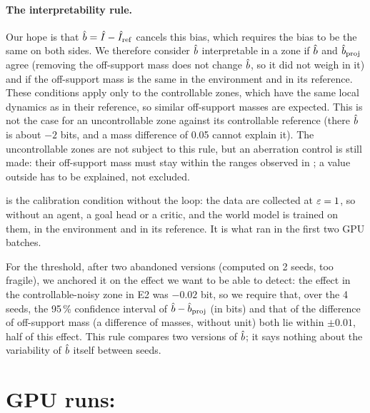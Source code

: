 \documentclass[10pt]{article}
\begin{document}
\paragraph{The interpretability rule.}
Our hope is that $\hat{b} = \hat{I} - \hat{I}_{\mathrm{ref}}$ cancels this bias, which requires the bias to be the same on both sides.
We therefore consider $\hat{b}$ interpretable in a zone if $\hat{b}$ and $\hat{b}_{\mathrm{proj}}$ agree (removing the
off-support mass does not change $\hat{b}$, so it did not weigh in it) and if the off-support mass is the same in the
environment and in its reference.
These conditions apply only to the controllable zones, which have the same local dynamics as in their reference, so
similar off-support masses are expected.
This is not the case for an uncontrollable zone against its controllable reference (there $\hat{b}$ is about $-2$ bits, %
and a mass difference of 0.05 cannot explain it). %
The uncontrollable zones are not subject to this rule, but an aberration control is still made: their off-support mass
must stay within the ranges observed in \EThreeZero{}; a value outside has to be explained, not excluded.

\EThreeZero{} is the calibration condition without the loop: the data are collected at $\varepsilon =
1$, so without an agent, a goal head or a critic, and the world model is trained on them, in the
environment and in its reference. It is what ran in the first two GPU batches.

For the threshold, after two abandoned versions (computed on 2 seeds, too fragile), we anchored it on the effect we %
want to be able to detect: the effect in the controllable-noisy zone in E2 was $-0.02$ bit, so we require that, over %
the 4 seeds, the 95\,\% confidence interval of $\hat{b} - \hat{b}_{\mathrm{proj}}$ (in bits) and that of the difference %
of off-support mass (a difference of masses, without unit) both lie within $\pm 0.01$, half of this effect. %
This rule compares two versions of $\hat{b}$; it says nothing about the variability of $\hat{b}$ itself between seeds.

\section{GPU runs: \EThreeZero}
\label{sec:e30}
\end{document}
